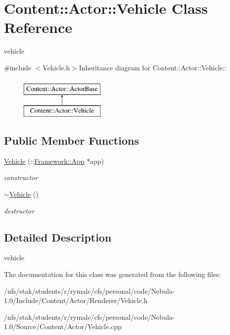 \hypertarget{classContent_1_1Actor_1_1Vehicle}{
\section{Content::Actor::Vehicle Class Reference}
\label{classContent_1_1Actor_1_1Vehicle}
}


vehicle  


{\ttfamily \#include $<$Vehicle.h$>$}Inheritance diagram for Content::Actor::Vehicle::\begin{figure}[H]
\begin{center}
\leavevmode
\includegraphics[height=2cm]{classContent_1_1Actor_1_1Vehicle}
\end{center}
\end{figure}
\subsection*{Public Member Functions}
\begin{DoxyCompactItemize}
\item 
\hypertarget{classContent_1_1Actor_1_1Vehicle_a69e68f181f90efcd46c9786335b8cc42}{
\hyperlink{classContent_1_1Actor_1_1Vehicle_a69e68f181f90efcd46c9786335b8cc42}{Vehicle} (::\hyperlink{classFramework_1_1App}{Framework::App} $\ast$app)}
\label{classContent_1_1Actor_1_1Vehicle_a69e68f181f90efcd46c9786335b8cc42}

\begin{DoxyCompactList}\small\item\em constructor \item\end{DoxyCompactList}\item 
\hypertarget{classContent_1_1Actor_1_1Vehicle_a0395530aaa81bd3de61767cba87e65b1}{
\hyperlink{classContent_1_1Actor_1_1Vehicle_a0395530aaa81bd3de61767cba87e65b1}{$\sim$Vehicle} ()}
\label{classContent_1_1Actor_1_1Vehicle_a0395530aaa81bd3de61767cba87e65b1}

\begin{DoxyCompactList}\small\item\em destructor \item\end{DoxyCompactList}\end{DoxyCompactItemize}


\subsection{Detailed Description}
vehicle 

The documentation for this class was generated from the following files:\begin{DoxyCompactItemize}
\item 
/nfs/stak/students/r/rymalc/cfs/personal/code/Nebula-\/1.0/Include/Content/Actor/Renderer/Vehicle.h\item 
/nfs/stak/students/r/rymalc/cfs/personal/code/Nebula-\/1.0/Source/Content/Actor/Vehicle.cpp\end{DoxyCompactItemize}
